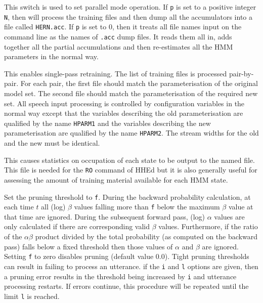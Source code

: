 \begin{optlist}
    This switch is used to set parallel mode operation.
      If {\tt p} is set to a positive integer {\tt N}, then  will
      process the training files and then dump all the accumulators
      into a file called {\tt HERN.acc}.  If {\tt p} is set to 0, then
      it treats all file names input on the command line as the names
      of {\tt .acc} dump files.  It reads them all in, adds together
      all the partial accumulations and then re-estimates all the
      HMM parameters in the normal way. 

    This enables single-pass retraining.  The list of training
      files is processed pair-by-pair.  For each pair, the first file
      should match the parameterisation of the original model set.  The
      second file should match the parameterisation of the required new
      set.  All speech input processing is controlled by configuration
      variables in the normal way except that the variables describing
      the old parameterisation are qualified by the name \texttt{HPARM1}
      and the variables describing the new parameterisation are
      qualified by the name \texttt{HPARM2}.  The stream widths for the
      old and the new must be identical.

   This causes statistics on occupation of each
      state to be output to the named file.  This file
      is needed for the {\tt RO} command of HHEd but it is also
      generally useful for assessing the amount of training material
      available for each HMM state.
      
   Set the pruning threshold to {\tt f}.  During the 
      backward probability calculation, at
      each time $t$ 
      all (log) $\beta$ values falling more than {\tt f} below the
      maximum $\beta$ value at that time are ignored.  During the
      subsequent forward pass, (log) $\alpha$ values are only
      calculated if there are corresponding valid $\beta$ values.
      Furthermore, if the ratio of the $ \alpha \beta $ product divided
      by the total probability (as computed on the backward pass)
      falls below a fixed threshold then those values of $\alpha$
      and $\beta$ are ignored. Setting {\tt f} to zero disables
      pruning  (default value 0.0).  Tight pruning thresholds can
       result in  failing to process an utterance.
      if the {\tt i} and {\tt l} options are given, then a pruning
      error results in the threshold being increased by {\tt i} and
      utterance processing restarts.  If errors continue, this procedure will 
      be repeated until the limit {\tt l} is reached.
      

\end{optlist}
